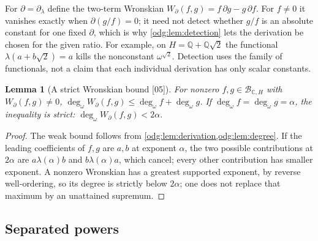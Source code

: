 \documentclass[11pt,oneside]{article}
\numberwithin{equation}{section}
\newtheorem{lemma}[lemma]{Lemma}
\theoremstyle{definition}
\theoremstyle{remark}
\newcommand{\Q}{\mathbb Q}
\newcommand{\C}{\mathbb C}
\newcommand{\ddeg}{\operatorname{deg}_{\omega}}
\newcommand{\src}[1]{\textup{\textsf{\small[#1]}}}
\begin{document}
For $\partial=\partial_\lambda$ define the two-term Wronskian
$W_\partial(f,g)=f\,\partial g-g\,\partial f$. For $f\ne0$ it vanishes exactly
when $\partial(g/f)=0$; it need not detect whether $g/f$ is an absolute
constant for one fixed $\partial$, which is why \cref{odg:lem:detection}
lets the derivation be chosen for the given ratio. For example, on
$H=\Q+\Q\sqrt2$ the functional $\lambda(a+b\sqrt2)=a$ kills the nonconstant
$\omega^{\sqrt2}$. Detection uses the family of functionals, not a claim
that each individual derivation has only scalar constants.

\begin{lemma}[A strict Wronskian bound \src{05}]\label{odg:lem:wronskian}
For nonzero $f,g\in\mathcal B_{\C,H}$ with $W_\partial(f,g)\ne0$,
$\ddeg W_\partial(f,g)\le\ddeg f+\ddeg g$. If $\ddeg f=\ddeg g=\alpha$, the
inequality is strict: $\ddeg W_\partial(f,g)<2\alpha$.
\end{lemma}
\begin{proof}
The weak bound follows from \cref{odg:lem:derivation,odg:lem:degree}. If the
leading coefficients of $f,g$ are $a,b$ at exponent $\alpha$, the two
possible contributions at $2\alpha$ are $a\lambda(\alpha)b$ and
$b\lambda(\alpha)a$, which cancel; every other contribution has smaller
exponent. A nonzero Wronskian has a greatest supported exponent, by reverse
well-ordering, so its degree is strictly below $2\alpha$; one does not replace
that maximum by an unattained supremum.
\end{proof}

\subsection{Separated powers}
\end{document}
